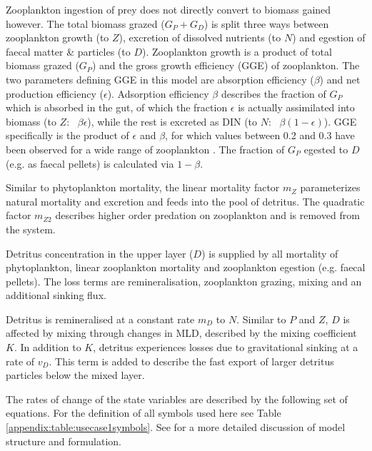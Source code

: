 \documentclass[journal abbreviation, manuscript]{copernicus}
\begin{document}
Zooplankton ingestion of prey does not directly convert to biomass gained however. The total biomass grazed ($G_P + G_D$) is split three ways between zooplankton growth (to $Z$), excretion of dissolved nutrients (to $N$) and egestion of faecal matter \& particles (to $D$). Zooplankton growth is a product of total biomass grazed ($G_P$) and the gross growth efficiency (GGE) of zooplankton. The two parameters defining GGE in this model are absorption efficiency ($\beta$) and net production efficiency ($\epsilon$). Adsorption efficiency $\beta$ describes the fraction of $G_P$ which is absorbed in the gut, of which the fraction $\epsilon$ is actually assimilated into biomass (to $Z$: \ $\beta \epsilon$), while the rest is excreted as DIN (to $N$: \ $\beta (1-\epsilon)$). GGE specifically is the product of $\epsilon$ and $\beta$, for which values between 0.2 and 0.3 have been observed for a wide range of zooplankton \citep{Straile1997GrossGroup}. The fraction of $G_P$ egested to $D$ (e.g. as faecal pellets) is calculated via $1-\beta$. 

Similar to phytoplankton mortality, the linear mortality factor $m_Z$ parameterizes natural mortality and excretion and feeds into the pool of detritus. The quadratic factor $m_{Z2}$ describes higher order predation on zooplankton and is removed from the system. 

Detritus concentration in the upper layer ($D$) is supplied by all mortality of phytoplankton, linear zooplankton mortality and zooplankton egestion (e.g. faecal pellets). The loss terms are remineralisation, zooplankton grazing, mixing and an additional sinking flux. 

Detritus is remineralised at a constant rate $m_D$ to $N$. Similar to $P$ and $Z$, $D$ is affected by mixing through changes in MLD, described by the mixing coefficient $K$. In addition to $K$, detritus experiences losses due to gravitational sinking at a rate of $v_D$. This term is added to describe the fast export of larger detritus particles below the mixed layer. 

The rates of change of the state variables are described by the following set of equations. For the definition of all symbols used here see Table \ref{appendix:table:usecase1symbols}. See \citet{Anderson2015c} for a more detailed discussion of model structure and formulation.
\end{document}
